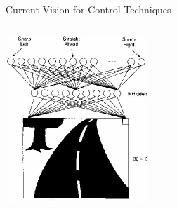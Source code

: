 \documentclass{beamer}
\begin{document}
\begin{frame}{Current Vision for Control Techniques}
\begin{columns}[l c]
			\includegraphics[width=0.5\textwidth]{alvinn.jpg}


	\end{columns}
	\end{frame}
\end{document}
